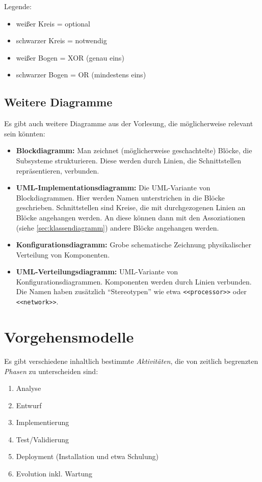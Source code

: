 \documentclass{panikzettel}
\begin{document}
Legende:
\begin{itemize}
\item weißer Kreis = optional
\item schwarzer Kreis = notwendig
\item weißer Bogen = XOR (genau eins)
\item schwarzer Bogen = OR (mindestens eins)
\end{itemize}

\subsection{Weitere Diagramme}

Es gibt auch weitere Diagramme aus der Vorlesung, die möglicherweise relevant sein könnten:

\begin{itemize}
\item \textbf{Blockdiagramm:} Man zeichnet (möglicherweise geschachtelte) Blöcke, die Subsysteme strukturieren. Diese werden durch Linien, die Schnittstellen repräsentieren, verbunden.
\item \textbf{UML-Implementationsdiagramm:} Die UML-Variante von Blockdiagrammen. Hier werden Namen unterstrichen in die Blöcke geschrieben. Schnittstellen sind Kreise, die mit durchgezogenen Linien an Blöcke angehangen werden. An diese können dann mit den Assoziationen (siehe \ref{sec:klassendiagramm}) andere Blöcke angehangen werden.
\item \textbf{Konfigurationsdiagramm:} Grobe schematische Zeichnung physikalischer Verteilung von Komponenten.
\item \textbf{UML-Verteilungsdiagramm:} UML-Variante von Konfigurationsdiagrammen. Komponenten werden durch Linien verbunden. Die Namen haben zusätzlich ``Stereotypen'' wie etwa \lstinline{<<processor>>} oder \lstinline{<<network>>}.
\end{itemize}

\section{Vorgehensmodelle}
\label{sec:vorgehensmodelle}

Es gibt verschiedene inhaltlich bestimmte \emph{Aktivitäten}, die von zeitlich begrenzten \emph{Phasen} zu unterscheiden sind:

\begin{enumerate}
\item Analyse
\item Entwurf
\item Implementierung
\item Test/Validierung
\item Deployment (Installation und etwa Schulung)
\item Evolution inkl. Wartung
\end{enumerate}
\end{document}

